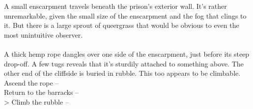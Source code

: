 A small enscarpment travels beneath the prison's exterior wall. It’s rather unremarkable, given the small size of the enscarpment and the fog that clings to it. But there is a large sprout of queergrass that would be obvious to even the most unintuitive observer.\\
\\

A thick hemp rope dangles over one side of the enscarpment, just before its steep drop-off. A few tugs reveals that it’s sturdily attached to something above. The other end of the cliffside is buried in rubble. This too appears to be climbable.\\

 Ascend the rope -- \\
 Return to the barracks -- \\
> Climb the rubble -- 